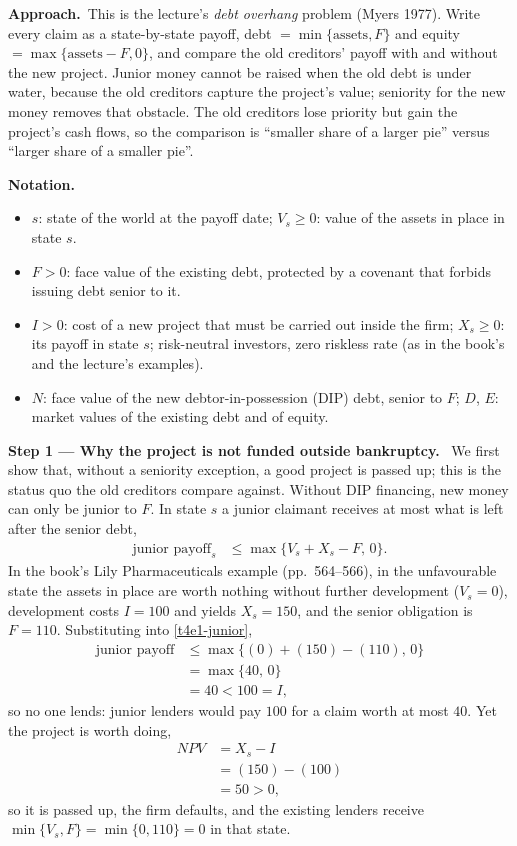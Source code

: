 \documentclass[11pt,a4paper]{article}
\newcommand{\notation}{\par\noindent\textbf{Notation.}}
\newcommand{\step}[2]{\par\medskip\noindent\textbf{Step #1 --- #2.}~}
\newcommand{\approach}{\par\smallskip\noindent\textbf{Approach.}~}
\begin{document}
\approach This is the lecture's \emph{debt overhang} problem (Myers 1977). Write every claim as
a state-by-state payoff, debt $=\min\{\text{assets},F\}$ and equity $=\max\{\text{assets}-F,0\}$,
and compare the old creditors' payoff with and without the new project. Junior money cannot be
raised when the old debt is under water, because the old creditors capture the project's value;
seniority for the new money removes that obstacle. The old creditors lose priority but gain the
project's cash flows, so the comparison is ``smaller share of a larger pie'' versus ``larger share
of a smaller pie''.

\notation
\begin{itemize}
  \item $s$: state of the world at the payoff date; $V_s\ge 0$: value of the assets in place in state $s$.
  \item $F>0$: face value of the existing debt, protected by a covenant that forbids issuing debt senior to it.
  \item $I>0$: cost of a new project that must be carried out inside the firm; $X_s\ge 0$: its payoff in state $s$; risk-neutral investors, zero riskless rate (as in the book's and the lecture's examples).
  \item $N$: face value of the new debtor-in-possession (DIP) debt, senior to $F$; $D$, $E$: market values of the existing debt and of equity.
\end{itemize}

\step{1}{Why the project is not funded outside bankruptcy} We first show that, without a
seniority exception, a good project is passed up; this is the status quo the old creditors
compare against. Without DIP financing, new money can only be junior to $F$. In state $s$ a junior claimant receives at most what is left after the
senior debt,
\begin{align}
  \text{junior payoff}_s &\le \max\{V_s+X_s-F,\,0\}. \label{t4e1-junior}
\end{align}
In the book's Lily Pharmaceuticals example (pp.~564--566), in the unfavourable state the
assets in place are worth nothing without further development ($V_s=0$), development costs
$I=100$ and yields $X_s=150$, and the senior obligation is $F=110$. Substituting into
\eqref{t4e1-junior},
\begin{align}
  \text{junior payoff} &\le \max\{(0)+(150)-(110),\,0\} \nonumber\\
                       &= \max\{40,\,0\} \nonumber\\
                       &= 40 < 100 = I, \nonumber
\end{align}
so no one lends: junior lenders would pay $100$ for a claim worth at most $40$. Yet the project
is worth doing,
\begin{align}
  \mathit{NPV} &= X_s-I \nonumber\\
               &= (150)-(100) \nonumber\\
               &= 50>0, \nonumber
\end{align}
so it is passed up, the firm defaults, and the existing lenders receive
$\min\{V_s,F\}=\min\{0,110\}=0$ in that state.
\end{document}
